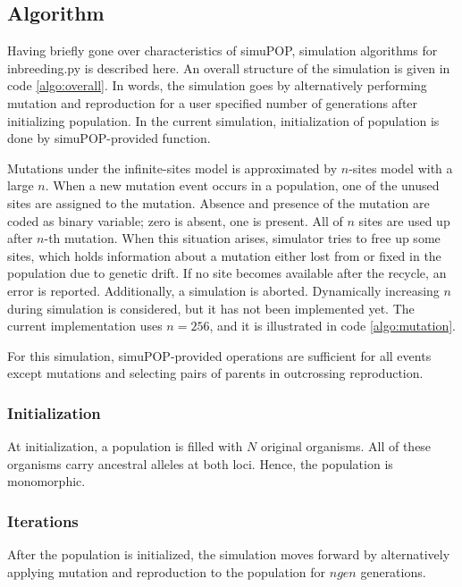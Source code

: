 \documentclass[12pt]{article}
\begin{document}
\subsection{Algorithm}
\label{sec:algorithm}

Having briefly gone over characteristics of simuPOP, simulation
algorithms for inbreeding.py is described here.
An overall structure of the simulation is given in code \ref{algo:overall}.
In words, the simulation goes by alternatively performing
mutation and reproduction for a user specified number of generations
after initializing population.
In the current simulation, initialization of population is done by
simuPOP-provided function.

Mutations under the infinite-sites model is approximated by
\(n\)-sites model with a large \(n\).
When a new mutation event occurs in a population, one of the unused
sites are assigned to the mutation.
Absence and presence of the mutation are coded as binary variable;
zero is absent, one is present.
All of \(n\) sites are used up after \(n\)-th mutation.
When this situation arises, simulator tries to free up some sites,
which holds information about a mutation either lost from or fixed in
the population due to genetic drift.
If no site becomes available after the recycle, an error is reported.
Additionally, a simulation is aborted.
Dynamically increasing \(n\) during simulation is considered, but it
has not been implemented yet.
The current implementation uses \(n = 256\), and it is illustrated in
code \ref{algo:mutation}.

For this simulation, simuPOP-provided operations are sufficient for
all events except mutations and selecting pairs of parents in
outcrossing reproduction.

\subsubsection{Initialization}
\label{sec:initialization}

At initialization, a population is filled with
\(N\) original organisms.
All of these organisms carry ancestral alleles at both loci.
Hence, the population is monomorphic.

\subsubsection{Iterations}
\label{sec:iterations}

After the population is initialized, the simulation moves forward by
alternatively applying mutation and reproduction to the population for
\(ngen\) generations.
\end{document}
